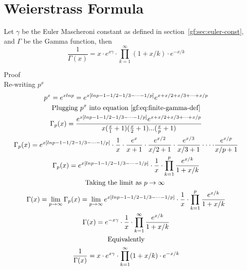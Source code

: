 \documentclass[a4paper]{article}
\begin{document}
    \section{Weierstrass Formula}\label{gf:sec:weierstrass}
    \begin{theorem}
        \label{gf:partial form}
        Let $\gamma$ be the Euler Mascheroni constant as defined in section~\ref{gf:sec:euler-const}, and $\Gamma$ be the Gamma function, then
        \begin{equation}
            \label{gf:eq:gamma-product}
            \frac{1}{\Gamma(x)}  = x \cdot e^{x \gamma} \cdot \prod_{k=1}^{\infty} (1 + x/k) \cdot e^{-x/k}
        \end{equation}

        Proof
        \\
        Re-writing $p^x$
        \begin{gather*}
            p^x = e^{x lnp} = e^{x [lnp - 1 - 1/2 - 1/3 - \dots - 1/p]} e^{x + x/2 + x/3 + \dots + x/p} \\
            \text{Plugging $p^x$ into equation~\ref{gf:eq:finite-gamma-def}} \\
            \Gamma_{p}(x) = \frac{e^{x [lnp - 1 - 1/2 - 1/3 - \dots - 1/p]} e^{x + x/2 + x/3 + \dots + x/p}}{x (\frac{x}{1} + 1)(\frac{x}{2} + 1)...(\frac{x}{p} + 1)}   \\
            \Gamma_{p}(x) = e^{x [lnp - 1 - 1/2 - 1/3 - \dots - 1/p]} \cdot \frac{1}{x} \cdot \frac{e^{x}}{x+1} \cdot \frac{e^{x/2}}{x/2+1} \cdot \frac{e^{x/3}}{x/3+1}
            \cdot \cdot \cdot \cdot \frac{e^{x/p}}{x/p+1}
            \\
            \Gamma_{p}(x) = e^{x [lnp - 1 - 1/2 - 1/3 - \dots - 1/p]} \cdot \frac{1}{x} \cdot \prod_{k=1}^{p} \frac{e^{x/k}}{1 + x/k} \\
            \text{Taking the limit as $p \to \infty$ }\\
            \Gamma(x) = \lim_{p \to \infty} \Gamma_{p}(x) =
            \lim_{p \to \infty} e^{x [lnp - 1 - 1/2 - 1/3 - \dots - 1/p]} \cdot \frac{1}{x} \cdot \prod_{k=1}^{p} \frac{e^{x/k}}{1 + x/k} \\
            \Gamma(x) = e^{-x \gamma} \cdot  \frac{1}{x} \cdot \prod_{k=1}^{\infty} \frac{e^{x/k}}{1 + x/k}  \\
            \text{Equivalently}\\
            \frac{1}{\Gamma(x)}  = x \cdot e^{x \gamma} \cdot \prod_{k=1}^{\infty} (1 + x/k) \cdot e^{-x/k}  \\
        \end{gather*}
    \end{theorem}
\end{document}
